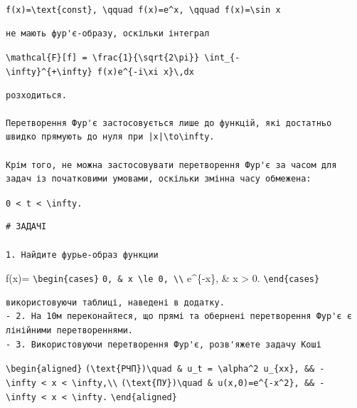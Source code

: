 \documentclass[
  ukrainian,
]{article}
\begin{document}
\texttt{f(x)=\textbackslash{}text\{const\},\ \textbackslash{}qquad\ f(x)=e\^{}x,\ \textbackslash{}qquad\ f(x)=\textbackslash{}sin\ x}

\begin{verbatim}
не мають фур'є-образу, оскільки інтеграл
\end{verbatim}

\texttt{\textbackslash{}mathcal\{F\}{[}f{]}\ =\ \textbackslash{}frac\{1\}\{\textbackslash{}sqrt\{2\textbackslash{}pi\}\}\ \textbackslash{}int\_\{-\textbackslash{}infty\}\^{}\{+\textbackslash{}infty\}\ f(x)e\^{}\{-i\textbackslash{}xi\ x\}\textbackslash{},dx}

\begin{verbatim}
розходиться.

Перетворення Фур'є застосовується лише до функцій, які достатньо швидко прямують до нуля при |x|\to\infty.

Крім того, не можна застосовувати перетворення Фур'є за часом для задач із початковими умовами, оскільки змінна часу обмежена:
\end{verbatim}

\texttt{0\ \textless{}\ t\ \textless{}\ \textbackslash{}infty.}

\begin{verbatim}
# ЗАДАЧІ

1. Найдите фурье-образ функции
\end{verbatim}

f(x)= \texttt{\textbackslash{}begin\{cases\}}
\texttt{0,\ \&\ x\ \textbackslash{}le\ 0,\ \textbackslash{}\textbackslash{}}
e\^{}\{-x\}, \& x \textgreater{} 0.
\texttt{\textbackslash{}end\{cases\}}

\begin{verbatim}
використовуючи таблиці, наведені в додатку.
- 2. На 10м переконайтеся, що прямі та обернені перетворення Фур'є є лінійними перетвореннями.
- 3. Використовуючи перетворення Фур'є, розв'яжете задачу Коші
\end{verbatim}

\texttt{\textbackslash{}begin\{aligned\}}
\texttt{(\textbackslash{}text\{РЧП\})\textbackslash{}quad\ \&\ u\_t\ =\ \textbackslash{}alpha\^{}2\ u\_\{xx\},\ \&\&\ -\textbackslash{}infty\ \textless{}\ x\ \textless{}\ \textbackslash{}infty,\textbackslash{}\textbackslash{}}
\texttt{(\textbackslash{}text\{ПУ\})\textbackslash{}quad\ \&\ u(x,0)=e\^{}\{-x\^{}2\},\ \&\&\ -\textbackslash{}infty\ \textless{}\ x\ \textless{}\ \textbackslash{}infty.}
\texttt{\textbackslash{}end\{aligned\}}
\end{document}
